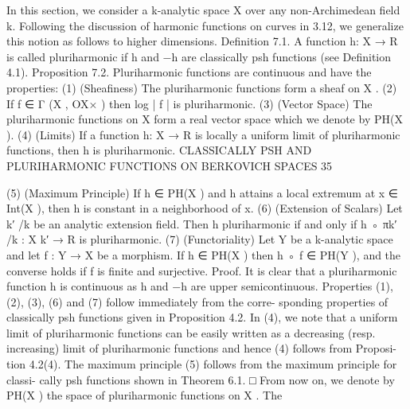 \documentclass[
  10pt,
]{article}
\newenvironment{Shaded}{}{}
\newcommand{\NormalTok}[1]{#1}
\begin{document}
\begin{Shaded}
\begin{Highlighting}[]
\NormalTok{  In this section, we consider a k{-}analytic space X over any non{-}Archimedean field k.}
\NormalTok{Following the discussion of harmonic functions on curves in 3.12, we generalize this}
\NormalTok{notion as follows to higher dimensions.}
\NormalTok{Definition 7.1. A function h: X → R is called pluriharmonic if h and −h are classically}
\NormalTok{psh functions (see Definition 4.1).}
\NormalTok{Proposition 7.2. Pluriharmonic functions are continuous and have the properties:}
\NormalTok{     (1) (Sheafiness) The pluriharmonic functions form a sheaf on X .}
\NormalTok{     (2) If f ∈ Γ (X , OX× ) then log | f | is pluriharmonic.}
\NormalTok{     (3) (Vector Space) The pluriharmonic functions on X form a real vector space which}
\NormalTok{         we denote by PH(X ).}
\NormalTok{     (4) (Limits) If a function h: X → R is locally a uniform limit of pluriharmonic functions,}
\NormalTok{         then h is pluriharmonic.}
\NormalTok{             CLASSICALLY PSH AND PLURIHARMONIC FUNCTIONS ON BERKOVICH SPACES              35}

\NormalTok{   (5) (Maximum Principle) If h ∈ PH(X ) and h attains a local extremum at x ∈ Int(X ),}
\NormalTok{       then h is constant in a neighborhood of x.}
\NormalTok{   (6) (Extension of Scalars) Let k′ /k be an analytic extension field. Then h pluriharmonic}
\NormalTok{       if and only if h ◦ πk′ /k : X k′ → R is pluriharmonic.}
\NormalTok{   (7) (Functoriality) Let Y be a k{-}analytic space and let f : Y → X be a morphism. If}
\NormalTok{       h ∈ PH(X ) then h ◦ f ∈ PH(Y ), and the converse holds if f is finite and surjective.}
\NormalTok{Proof. It is clear that a pluriharmonic function h is continuous as h and −h are upper}
\NormalTok{semicontinuous. Properties (1), (2), (3), (6) and (7) follow immediately from the corre{-}}
\NormalTok{sponding properties of classically psh functions given in Proposition 4.2. In (4), we note}
\NormalTok{that a uniform limit of pluriharmonic functions can be easily written as a decreasing}
\NormalTok{(resp. increasing) limit of pluriharmonic functions and hence (4) follows from Proposi{-}}
\NormalTok{tion 4.2(4). The maximum principle (5) follows from the maximum principle for classi{-}}
\NormalTok{cally psh functions shown in Theorem 6.1.                                               □}
\NormalTok{   From now on, we denote by PH(X ) the space of pluriharmonic functions on X . The}
\end{Highlighting}
\end{Shaded}
\end{document}
